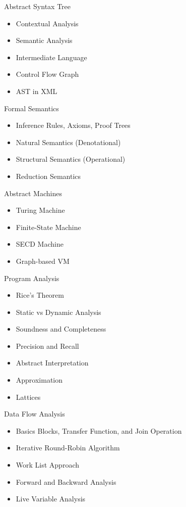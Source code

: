 \documentclass[nobrand,anonymous,nodate,nosecurity]{huawei}
\begin{document}
{\begin{lectures}
\begin{itemize}
	\end{itemize}
\item Abstract Syntax Tree
	\begin{itemize}
	\item Contextual Analysis
	\item Semantic Analysis
	\item Intermediate Language
	\item Control Flow Graph
	\item AST in XML
	\end{itemize}
\item Formal Semantics
	\begin{itemize}
	\item Inference Rules, Axioms, Proof Trees
	\item Natural Semantics (Denotational)
	\item Structural Semantics (Operational)
	\item Reduction Semantics
	\end{itemize}
\item Abstract Machines
	\begin{itemize}
	\item Turing Machine
	\item Finite-State Machine
	\item SECD Machine
	\item Graph-based VM
	\end{itemize}
\item Program Analysis
	\begin{itemize}
	\item Rice's Theorem
	\item Static vs Dynamic Analysis
	\item Soundness and Completeness
	\item Precision and Recall
	\item Abstract Interpretation
	\item Approximation
	\item Lattices
	\end{itemize}
\item Data Flow Analysis
	\begin{itemize}
	\item Basics Blocks, Transfer Function, and Join Operation
	\item Iterative Round-Robin Algorithm
	\item Work List Approach
	\item Forward and Backward Analysis
	\item Live Variable Analysis

\end{itemize}
\end{lectures}}
\end{document}
